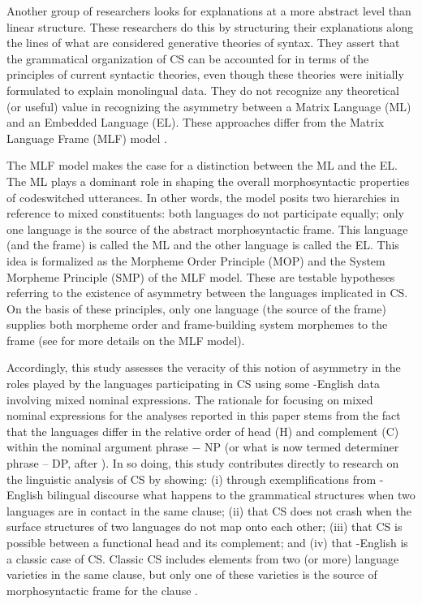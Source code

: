 \documentclass[output=paper]{langsci/langscibook}
\begin{document}
Another group of researchers looks for explanations at a more abstract level than linear structure. These researchers \citep{BelaziEtAl1994,DiSciulloEtAl1986,MacSwan2009} do this by structuring their explanations along the lines of what are considered generative theories of syntax. They assert that the grammatical organization of CS can be accounted for in terms of the principles of current syntactic theories, even though these theories were initially formulated to explain monolingual data. They do not recognize any theoretical (or useful) value in recognizing the asymmetry between a Matrix Language (ML) and an Embedded Language (EL). These approaches differ from the Matrix Language Frame (MLF) model \citep{MyersScotton1993,MyersScotton2002,MyersScotton2013}.

The MLF model makes the case for a distinction between the ML and the EL. The ML plays a dominant role in shaping the overall morphosyntactic properties of codeswitched utterances. In other words, the model posits two hierarchies in reference to mixed constituents: both languages do not participate equally; only one language is the source of the abstract morphosyntactic frame. This language (and the frame) is called the ML and the other language is called the EL. This idea is formalized as the Morpheme Order Principle (MOP) and the System Morpheme Principle (SMP) of the MLF model. These are testable hypotheses referring to the existence of asymmetry between the languages implicated in CS. On the basis of these principles, only one language (the source of the frame) supplies both morpheme order and frame-building system morphemes to the frame (see  for more details on the MLF model). 

Accordingly, this study assesses the veracity of this notion of asymmetry in the roles played by the languages participating in CS using some -English data involving mixed nominal expressions. The rationale for focusing on mixed nominal expressions for the analyses reported in this paper stems from the fact that the languages differ in the relative order of head (H) and complement (C) within the nominal argument phrase $-$ NP (or what is now termed determiner phrase – DP, after \citealt{Abney1987}). In so doing, this study contributes directly to research on the linguistic analysis of CS by showing: (i) through exemplifications from -English bilingual discourse what happens to the grammatical structures when two languages are in contact in the same clause; (ii) that CS does not crash when the surface structures of two languages do not map onto each other; (iii) that CS is possible between a functional head and its complement; and (iv) that -English is a classic case of CS. Classic CS includes elements from two (or more) language varieties in the same clause, but only one of these varieties is the source of morphosyntactic frame for the clause \citep[8]{MyersScotton2002}.
\end{document}
